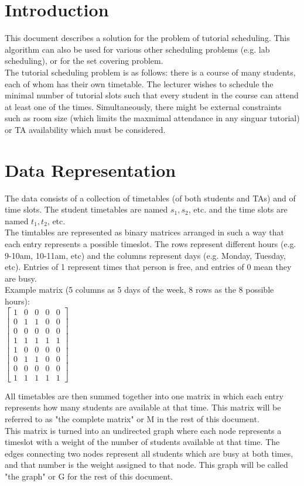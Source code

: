 \documentclass[12pt, a4paper]{article}
\begin{document}

\section{Introduction}
This document describes a solution for the problem of tutorial scheduling. This algorithm can also be used for various other scheduling problems (e.g. lab scheduling), or for the set covering problem. \\
The tutorial scheduling problem is as follows: there is a course of many students, each of whom has their own timetable. The lecturer wishes to schedule the minimal number of tutorial slots such that every student in the course can attend at least one of the times.
 Simultaneously, there might be external constraints such as room size (which limits the maxmimal attendance in any singuar tutorial) or TA availability which must be considered. 

\section{Data Representation}
The data consists of a collection of timetables (of both students and TAs) and of time slots. The student timetables are named $s_1, s_2$, etc. and the time slots are named $t_1, t_2$, etc. \\ 
The timtables are represented as binary matrices arranged in such a way that each entry represents a possible timeslot. The rows represent different hours (e.g. 9-10am, 10-11am, etc) and the columns represent days (e.g. Monday, Tuesday, etc). Entries of 1 represent times that person is free, and entries of 0 mean they are busy.\\
Example matrix (5 columns as 5 days of the week, 8 rows as the 8 possible hours):\\

$\begin{bmatrix}
1 & 0 & 0 & 0 & 0\\
0 & 1 & 1 & 0 & 0\\
0 & 0 & 0 & 0 & 0\\
1 & 1 & 1 & 1 & 1\\
1 & 0 & 0 & 0 & 0\\
0 & 1 & 1 & 0 & 0\\
0 & 0 & 0 & 0 & 0\\
1 & 1 & 1 & 1 & 1
\end{bmatrix}$ 

\par
All timetables are then summed together into one matrix in which each entry represents how many students are available at that time. This matrix will be referred to as "the complete matrix" or M in the rest of this document. \\
This matrix is turned into an undirected graph where each node represents a timeslot with a weight of the number of students available at that time. The edges connecting two nodes represent all students which are busy at both times, and that number is the weight assigned to that node. This graph will be called "the graph" or G for the rest of this document.\\
\end{document}

